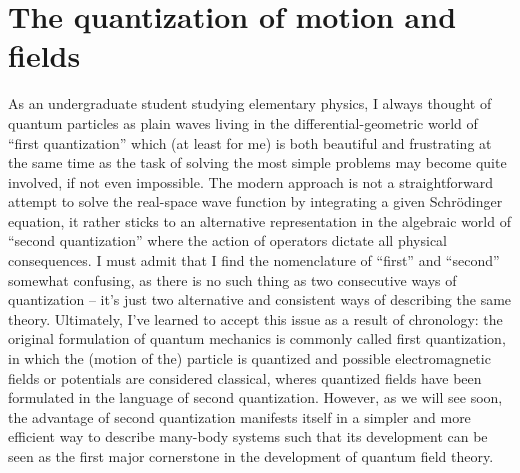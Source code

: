 \chapter{The quantization of motion and fields}
\label{ch:the_quantization_of_motion_and_fields}
%
%
As an undergraduate student studying elementary physics, I always thought of quantum particles as plain waves living in the differential-geometric world of ``first quan\-ti\-zation'' which (at least for me) is both beautiful and frustrating at the same time as the task of solving the most simple problems may become quite involved, if not even impossible.
The modern approach is not a straightforward attempt to solve the real-space wave function by integrating a given Schrödinger equation, it rather sticks to an alternative representation in the algebraic world of ``second quantization'' where the action of operators dictate all physical consequences.
I must admit that I find the nomenclature of ``first'' and ``second'' somewhat confusing, as there is no such thing as two consecutive ways of quantization -- it's just two alternative and consistent ways of describing the same theory.
Ultimately, I've learned to accept this issue as a result of chronology: the original formulation of quantum mechanics is commonly called first quantization, in which the (motion of the) particle is quantized and possible electromagnetic fields or potentials are considered classical, wheres quantized fields have been formulated in the language of second quantization.
However, as we will see soon, the advantage of second quantization manifests itself in a simpler and more efficient way to describe many-body systems such that its development can be seen as the first major cornerstone in the development of quantum field theory.
\\

